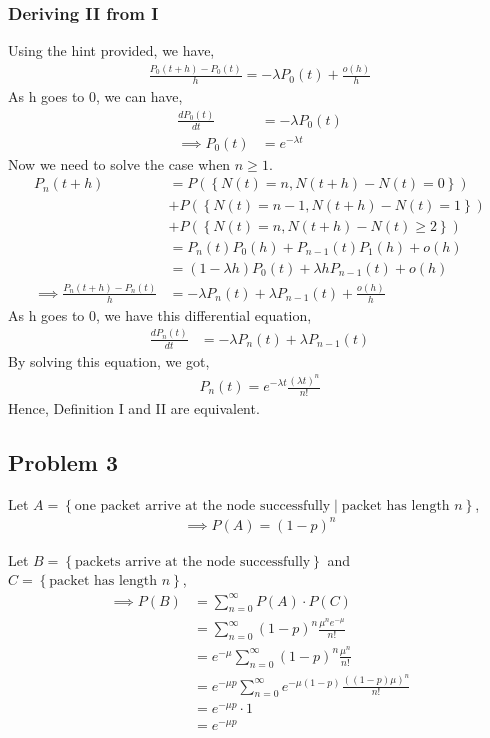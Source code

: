 \documentclass{article}
\begin{document}
		\subsubsection*{Deriving II from I}
			Using the hint provided, we have,
			\begin{gather*}
				\frac{P_{0}(t+h) - P_{0}(t)}{h} = -\lambda P_{0}(t) + \frac{o(h)}{h}
			\end{gather*}
			As h goes to 0, we can have,
			\begin{align*}
				\frac{dP_{0}(t)}{dt} &= -\lambda P_{0}(t) \\
				\implies P_{0}(t) &= e^{-\lambda t}
			\end{align*}
			Now we need to solve the case when $n \geqslant 1$.
			\begin{align*}
				P_{n}(t+h) &= P(\left\{ N(t) = n, N(t+h) - N(t) = 0 \right\}) \\
				&+ P(\left\{ N(t) = n - 1, N(t+h) - N(t) = 1 \right\}) \\
				&+ P(\left\{ N(t) = n, N(t+h) - N(t) \geqslant 2 \right\}) \\
				&= P_{n}(t)P_{0}(h) + P_{n-1}(t)P_{1}(h) + o(h) \\
				&= (1 - \lambda h)P_{0}(t) + \lambda h P_{n-1}(t) + o(h) \\
				\implies \frac{P_{n}(t+h) - P_{n}(t)}{h} &= -\lambda P_{n}(t) + \lambda P_{n-1}(t) + \frac{o(h)}{h}
			\end{align*}
			As h goes to 0, we have this differential equation,
			\begin{align*}
				\frac{dP_{n}(t)}{dt} &= -\lambda P_{n}(t) + \lambda P_{n-1}(t)
			\end{align*}
			By solving this equation, we got,
			\begin{align*}
				P_{n}(t) = e^{-\lambda t} \frac{(\lambda t)^n}{n!}
			\end{align*}
			Hence, Definition I and II are equivalent.

	\subsection*{Problem 3}

		Let $A = \left\{ \text{one packet arrive at the node successfully} \mid \text{packet has length } n \right\}$,
		\begin{gather*}
			\implies P(A) = (1-p)^{n}
		\end{gather*}

		Let $B = \left\{ \text{packets arrive at the node successfully} \right\}$
		and $C = \left\{ \text{packet has length } n \right\} $,
		\begin{align*}
			\implies P(B) &= \sum_{n = 0}^{\infty} P(A) \cdot P(C) \\
			&= \sum_{n = 0}^{\infty} (1-p)^{n} \frac{\mu^{n}e^{-\mu}}{n!} \\
			&= e^{-\mu} \sum_{n = 0}^{\infty} (1-p)^{n} \frac{\mu^{n}}{n!} \\
			&= e^{-\mu p} \sum_{n = 0}^{\infty} e^{-\mu (1-p)} \frac{((1-p)\mu)^{n}}{n!} \\
			&= e^{-\mu p} \cdot 1 \\
			&= e^{-\mu p}
		\end{align*}
\end{document}
